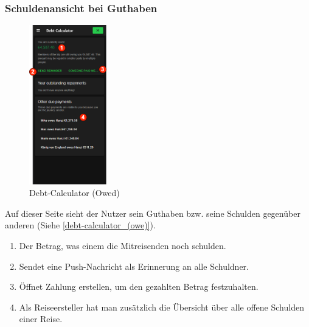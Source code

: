 \subsubsection{Schuldenansicht bei Guthaben}\label{debt-calculator_(owed)}
\begin{figure}[H]
	\centering
	\includegraphics[width=0.3\textwidth]{img/pages_numbers/debt-calculator_(owed).drawio}
	\caption[Debt-Calculator (Owed)]{Debt-Calculator (Owed)}
	\label{fig:debt-calculator_(owed)}
\end{figure}
Auf dieser Seite sieht der Nutzer sein Guthaben bzw. seine Schulden gegenüber anderen (Siehe \ref{debt-calculator_(owe)}).
\begin{enumerate}[label=\protect\circled{\arabic*}]
	\item Der Betrag, was einem die Mitreisenden noch schulden.
	\item Sendet eine Push-Nachricht als Erinnerung an alle Schuldner.
	\item Öffnet Zahlung erstellen, um den gezahlten Betrag festzuhalten.
	\item Als Reiseersteller hat man zusätzlich die Übersicht über alle offene Schulden einer Reise.
\end{enumerate}

